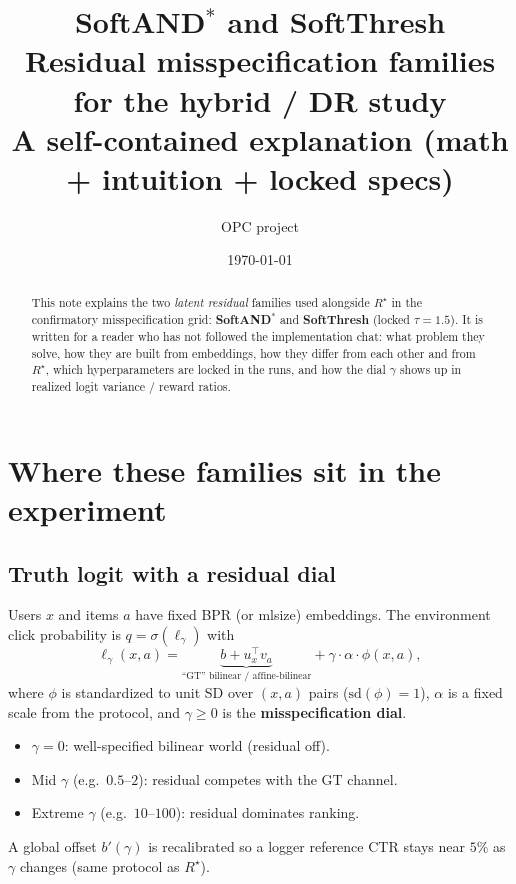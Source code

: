 \documentclass[11pt,a4paper]{article}
\title{\textbf{SoftAND$^*$ and SoftThresh}\\
\large Residual misspecification families for the hybrid / DR study\\
\normalsize A self-contained explanation (math + intuition + locked specs)}
\author{OPC project}
\date{\today}
\begin{document}
\maketitle

\begin{abstract}
\noindent
This note explains the two \emph{latent residual} families used alongside $R^\star$
in the confirmatory misspecification grid: \textbf{SoftAND$^*$} and
\textbf{SoftThresh} (locked $\tau{=}1.5$).
It is written for a reader who has not followed the implementation chat:
what problem they solve, how they are built from embeddings, how they differ
from each other and from $R^\star$, which hyperparameters are locked in the
runs, and how the dial $\gamma$ shows up in realized logit variance /
reward ratios.
\end{abstract}

\tableofcontents
\newpage

\section{Where these families sit in the experiment}

\subsection{Truth logit with a residual dial}
Users $x$ and items $a$ have fixed BPR (or mlsize) embeddings.
The environment click probability is $q=\sigma(\ell_\gamma)$ with
\begin{equation}
\label{eq:world}
\ell_\gamma(x,a)
=
\underbrace{b + u_x^\top v_a}_{\text{``GT'' bilinear / affine-bilinear}}
+
\gamma\cdot\alpha\cdot\phi(x,a),
\end{equation}
where $\phi$ is standardized to unit SD over $(x,a)$ pairs
($\mathrm{sd}(\phi)=1$), $\alpha$ is a fixed scale from the protocol,
and $\gamma\ge 0$ is the \textbf{misspecification dial}.

\begin{itemize}[leftmargin=1.2em]
\item $\gamma=0$: well-specified bilinear world (residual off).
\item Mid $\gamma$ (e.g.\ $0.5$--$2$): residual competes with the GT channel.
\item Extreme $\gamma$ (e.g.\ $10$--$100$): residual dominates ranking.
\end{itemize}

A global offset $b'(\gamma)$ is recalibrated so a logger reference CTR stays
near $5\%$ as $\gamma$ changes (same protocol as $R^\star$).
\end{document}
